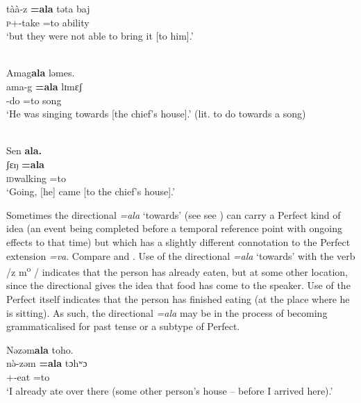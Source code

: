       \medskip
\gll tàà-z     \textbf{=ala}  təta    baj\\      
     \textsc{p}+{\HOR}-take   =to      ability  {\NEG}\\ 
\glt  ‘but they were not able to bring it [to him].'\\  
\z 

\ea\label{ex:7:119}\\
Amag\textbf{ala}  ləmes.\\
\gll  ama-g   \textbf{=ala}  lɪmɛʃ\\
      {\DEP}-do  =to  song\\
\glt  ‘He was singing towards [the chief’s house].' (lit. to do towards a song)\\
\z 

\medskip
\ea\label{ex:7:120}\\
Sen  \textbf{ala}\textbf{.}\\
\gll  ʃɛŋ          \textbf{=ala}\\
      \textsc{id}walking               =to\\
\glt  ‘Going, [he] came [to the chief’s house].’\\
\z 

Sometimes the directional \textit{=ala} ‘towards’ (see see ) can carry a Perfect kind of idea (an event being completed before a temporal reference point with ongoing effects to that time) but which has a slightly different connotation to the Perfect extension \textit{=va}. Compare  and . Use of the directional \textit{=ala} ‘towards’  with the verb /z m\textsuperscript{o}\textit{ }/ indicates that the person has already eaten, but at some other location, since the directional gives the idea that food has come to the speaker. Use of the Perfect itself  indicates that the person has finished eating (at the place where he is sitting). As such, the directional\textit{ =ala } may be in the process of becoming grammaticalised for past tense or a subtype of Perfect.

\ea\label{ex:7:121}
Nəzəm\textbf{ala} toho.\\
\gll  n\`ə-zəm  \textbf{=ala} tɔhʷɔ\\
      {\oneS}+{\PFV}-eat  =to  {\DEM}\\
\glt  ‘I already ate over there (some other person’s house – before I arrived here).’\\
\z 

